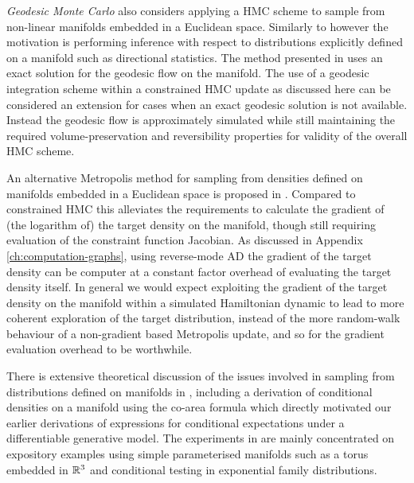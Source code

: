 \emph{Geodesic Monte Carlo} \citep{byrne2013geodesic} also considers applying a \ac{HMC} scheme to sample from non-linear manifolds embedded in a Euclidean space. Similarly to \citep{brubaker2012family} however the motivation is performing inference with respect to distributions explicitly defined on a manifold such as directional statistics. The method presented in \citep{byrne2013geodesic} uses an exact solution for the geodesic flow on the manifold. The use of a geodesic integration scheme within a constrained \ac{HMC} update as discussed here can be considered an extension for cases when an exact geodesic solution is not available. Instead the geodesic flow is approximately simulated while still maintaining the required volume-preservation and reversibility properties for validity of the overall \ac{HMC} scheme.

An alternative Metropolis method for sampling from densities defined on manifolds embedded in a Euclidean space is proposed in \citep{zappa2017monte}. Compared to constrained \ac{HMC} this alleviates the requirements to calculate the gradient of (the logarithm of) the target density on the manifold, though still requiring evaluation of the constraint function Jacobian. As discussed in Appendix \ref{ch:computation-graphs}, using reverse-mode \ac{AD} the gradient of the target density can be computer at a constant factor overhead of evaluating the target density itself. In general we would expect exploiting the gradient of the target density on the manifold within a simulated Hamiltonian dynamic to lead to more coherent exploration of the target distribution, instead of the more random-walk behaviour of a non-gradient based Metropolis update, and so for the gradient evaluation overhead to be worthwhile.

There is extensive theoretical discussion of the issues involved in samp\-ling from distributions defined on manifolds in \citep{diaconis2013sampling}, including a derivation of conditional densities on a manifold using the co-area formula which directly motivated our earlier derivations of expressions for conditional expectations under a differentiable generative model. The experiments in \citep{diaconis2013sampling} are mainly concentrated on expository examples using simple parameterised manifolds such as a torus embedded in $\mathbb{R}^3$ and conditional testing in exponential family distributions. 



